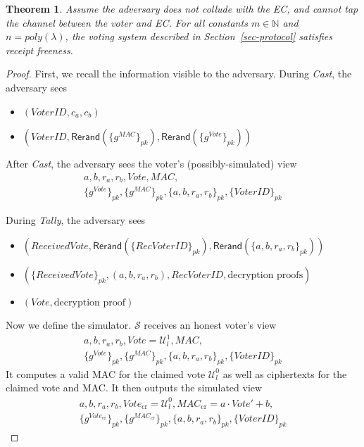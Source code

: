 \documentclass[12pt,a4paper]{article}
\newtheorem{theorem}{Theorem}
\theoremstyle{definition}
\newcommand{\Vote}{\mathit{Vote}}
\newcommand{\ReceivedVote}{\mathit{ReceivedVote}}
\newcommand{\VoterID}{\mathit{VoterID}}
\newcommand{\receivedvid}{\mathit{RecVoterID}}
\newcommand{\Mac}{\mathit{MAC}}
\begin{document}
\begin{theorem}\label{thm-Rec-free}
    Assume the adversary does not collude with the EC, and cannot tap the channel between the voter and EC. For all constants $m \in \mathbb{N}$ and $n=poly(\lambda)$, the voting system described in Section~\ref{sec-protocol} satisfies receipt freeness.
\end{theorem}
\begin{proof}
    First, we recall the information visible to the adversary. During \textit{Cast}, the adversary sees
    
    \begin{itemize}
        \item $(\VoterID, c_a, c_b)$
        \item $(\VoterID, \mathsf{Rerand}(\{g^{\Mac}\}_{pk}), \mathsf{Rerand}(\{g^{\Vote}\}_{pk}))$
    \end{itemize}

    After \textit{Cast}, the adversary sees the voter's (possibly-simulated) view
    \begin{gather*}
        a, b, r_a, r_b, \Vote, \Mac,\\\{g^\Vote\}_{pk}, \{g^\Mac\}_{pk}, \{a,b,r_a,r_b\}_{pk},\{\VoterID\}_{pk}
    \end{gather*}

    During \textit{Tally}, the adversary sees
    \begin{itemize}
        \item $(\ReceivedVote, \mathsf{Rerand}(\{\receivedvid\}_{pk}), \mathsf{Rerand}(\{a, b, r_a, r_b\}_{pk}))$
        \item $(\{\ReceivedVote\}_{pk}, (a, b, r_a, r_b), \receivedvid, \text{decryption proofs})$
        \item $(\Vote, \text{decryption proof})$
    \end{itemize}

    Now we define the simulator. $\mathcal{S}$ receives an honest voter's view
    \begin{gather*}
        a, b, r_a, r_b, \Vote=\mathcal{U}^1_l, \Mac,\\\{g^\Vote\}_{pk}, \{g^\Mac\}_{pk}, \{a,b,r_a,r_b\}_{pk},\{\VoterID\}_{pk}
    \end{gather*}
    It computes a valid MAC for the claimed vote $\mathcal{U}^0_l$ as well as ciphertexts for the claimed vote and MAC. It then outputs the simulated view
    \begin{gather*}
        a, b, r_a, r_b, \Vote_{\text{cr}}=\mathcal{U}^0_l, \Mac_{\text{cr}}=a\cdot\Vote'+b,\\\{g^{\Vote_{\text{cr}}}\}_{pk}, \{g^{\Mac_{\text{cr}}}\}_{pk}, \{a,b,r_a,r_b\}_{pk},\{\VoterID\}_{pk}
    \end{gather*}


\end{proof}
\end{document}
